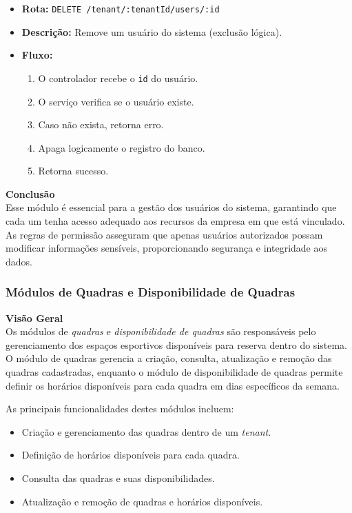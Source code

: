 \begin{itemize}
  \item \textbf{Rota:} \texttt{DELETE /tenant/:tenantId/users/:id}
  \item \textbf{Descrição:} Remove um usuário do sistema (exclusão lógica).
  \item \textbf{Fluxo:}
  \begin{enumerate}
    \item O controlador recebe o \texttt{id} do usuário.
    \item O serviço verifica se o usuário existe.
    \item Caso não exista, retorna erro.
    \item Apaga logicamente o registro do banco.
    \item Retorna sucesso.
  \end{enumerate}
\end{itemize}

\textbf{Conclusão} \\
Esse módulo é essencial para a gestão dos usuários do sistema, garantindo que cada um tenha acesso adequado aos recursos da empresa em que está vinculado. As regras de permissão asseguram que apenas usuários autorizados possam modificar informações sensíveis, proporcionando segurança e integridade aos dados.

\subsubsection{Módulos de Quadras e Disponibilidade de Quadras}\label{subsubsec:modulos_quadras_disponibilidade_quadras}

\textbf{Visão Geral}\\
Os módulos de \textit{quadras} e \textit{disponibilidade de quadras} são responsáveis pelo gerenciamento dos espaços esportivos disponíveis para reserva dentro do sistema. O módulo de quadras gerencia a criação, consulta, atualização e remoção das quadras cadastradas, enquanto o módulo de disponibilidade de quadras permite definir os horários disponíveis para cada quadra em dias específicos da semana.

As principais funcionalidades destes módulos incluem:

\begin{itemize}
    \item Criação e gerenciamento das quadras dentro de um \textit{tenant}.
    \item Definição de horários disponíveis para cada quadra.
    \item Consulta das quadras e suas disponibilidades.
    \item Atualização e remoção de quadras e horários disponíveis.
\end{itemize}

